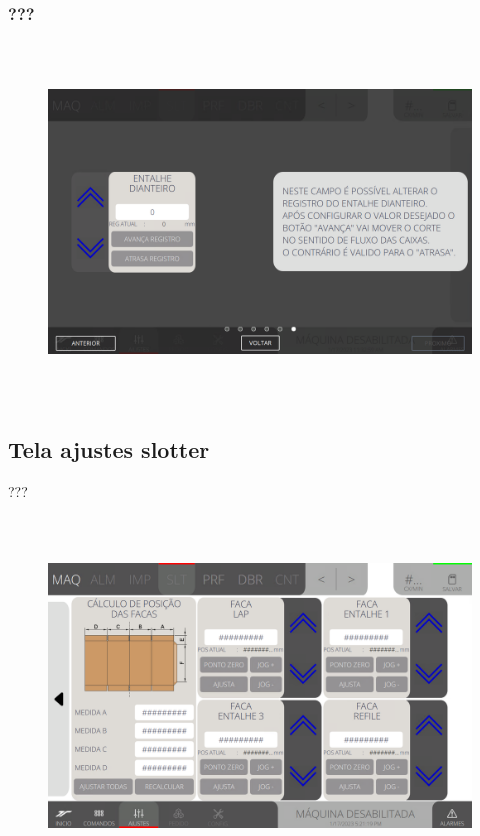 \newpage
\thispagestyle{fancy}
\vspace*{\fill}
\subsubsection{\small{???}}
\begin{figure}[h]
  \centering
  \includegraphics[width=576px,height=360px]{src/imagesFlexo/05-slotter/settings/e-6.png}
   \label{}
\end{figure}
\vspace*{\fill}

\newpage
\thispagestyle{fancy}
\vspace*{\fill}
\subsection{Tela ajustes slotter}
 ???
\begin{figure}[h]
  \centering
  \includegraphics[width=576px,height=360px]{src/imagesFlexo/05-slotter/settings/e-Tela-Principal-2.png}
   \label{}
\end{figure}

